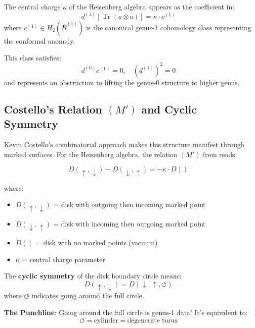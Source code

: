 \begin{theorem}
The central charge $\kappa$ of the Heisenberg algebra appears as the coefficient in:
\begin{equation}
d^{(1)}[\operatorname{Tr}(a \otimes a)] = \kappa \cdot c^{(1)}
\end{equation}
where $c^{(1)} \in H_2(\bar{B}^{(1)})$ is the canonical genus-1 cohomology class representing the conformal anomaly.

This class satisfies:
\begin{equation}
d^{(0)} c^{(1)} = 0, \quad (d^{(1)})^2 = 0
\end{equation}
and represents an obstruction to lifting the genus-0 structure to higher genus.
\end{theorem}

\subsection{Costello's Relation $(M')$ and Cyclic Symmetry}

Kevin Costello's combinatorial approach makes this structure manifest through marked surfaces. For the Heisenberg algebra, the relation $(M')$ from \cite{Costello2016} reads:

\begin{equation}
D(\uparrow, \downarrow) - D(\downarrow, \uparrow) = -\kappa \cdot D()
\end{equation}

where:
\begin{itemize}
\item $D(\uparrow, \downarrow)$ = disk with outgoing then incoming marked point
\item $D(\downarrow, \uparrow)$ = disk with incoming then outgoing marked point  
\item $D()$ = disk with no marked points (vacuum)
\item $\kappa$ = central charge parameter
\end{itemize}

The \textbf{cyclic symmetry} of the disk boundary circle means:
\begin{equation}
D(\uparrow, \downarrow) = D(\downarrow, \uparrow, \circlearrowleft)
\end{equation}
where $\circlearrowleft$ indicates going around the full circle.

\textbf{The Punchline}: Going around the full circle is genus-1 data! It's equivalent to:
\begin{equation}
\circlearrowleft = \text{cylinder} = \text{degenerate torus}
\end{equation}

